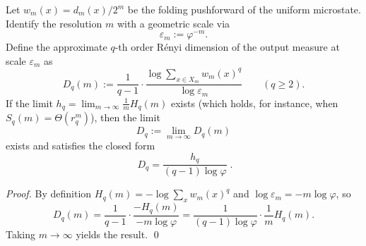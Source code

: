 
\begin{proposition}\label{prop:pom-renyi-dimension-spectrum}
Let \(w_m(x)=d_m(x)/2^m\) be the folding pushforward of the uniform microstate. Identify the resolution \(m\) with a geometric scale via
\[
\varepsilon_m:=\varphi^{-m}.
\]
Define the approximate \(q\)-th order R\'enyi dimension of the output measure at scale \(\varepsilon_m\) as
\[
D_q(m):=\frac{1}{q-1}\cdot \frac{\log\sum_{x\in X_m}w_m(x)^q}{\log \varepsilon_m}
\qquad(q\ge 2).
\]
If the limit \(h_q=\lim_{m\to\infty}\frac{1}{m}H_q(m)\) exists (which holds, for instance, when \(S_q(m)=\Theta(r_q^m)\)), then the limit
\[
D_q:=\lim_{m\to\infty}D_q(m)
\]
exists and satisfies the closed form
\[
\boxed{\;
D_q=\frac{h_q}{(q-1)\log\varphi}\; }.
\]
\end{proposition}
\begin{proof}
By definition \(H_q(m)=-\log\sum_x w_m(x)^q\) and \(\log\varepsilon_m=-m\log\varphi\), so
\[
D_q(m)=\frac{1}{q-1}\cdot \frac{-H_q(m)}{-m\log\varphi}
=\frac{1}{(q-1)\log\varphi}\cdot \frac{1}{m}H_q(m).
\]
Taking \(m\to\infty\) yields the result. \qed
\end{proof}


